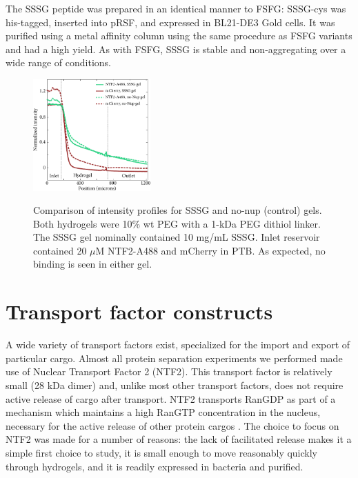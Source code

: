 The SSSG peptide was prepared in an identical manner to FSFG: SSSG-cys was his-tagged, inserted into pRSF, and expressed in BL21-DE3 Gold cells.  It was purified using a metal  affinity column using the same procedure as FSFG variants and had a high yield.  As with FSFG, SSSG is stable and non-aggregating over a wide range of conditions.
\begin{figure} %
\caption{Comparison of intensity profiles for SSSG and no-nup (control) gels. Both hydrogels were 10\% wt PEG with a 1-kDa PEG dithiol linker.  The SSSG gel nominally contained 10 mg/mL SSSG.  Inlet reservoir contained 20 $\mu$M NTF2-A488 and mCherry in PTB.  As expected, no binding is seen in either gel.\\}
\centering
\includegraphics[width=0.4\textwidth]{figs/ch03/SSSG-control-comparison}
\label{fig:SSSG-control-comparison}
\end{figure} 

\section{Transport factor constructs}

A wide variety of transport factors exist, specialized for the import and export of particular cargo.  Almost all protein separation experiments we performed made use of Nuclear Transport Factor 2 (NTF2).  This transport factor is relatively small (28 kDa dimer) and, unlike most other transport factors, does not require active release of cargo after transport. NTF2 transports RanGDP as part of a mechanism which maintains a high RanGTP concentration in the nucleus, necessary for the active release of other protein cargos \cite{ribbeck98}.  The choice to focus on NTF2 was made for a number of reasons: the lack of facilitated release makes it a simple first choice to study, it is small enough to move reasonably quickly through hydrogels, and it is readily expressed in bacteria and purified.

